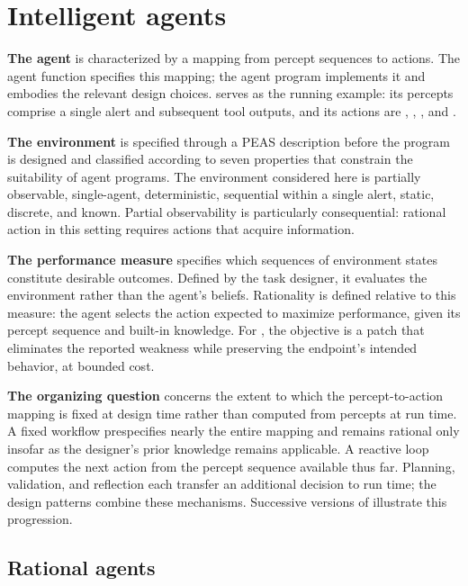 \section{Intelligent agents}
\label{sec:agents}

\begin{upshot}
\item \textbf{The agent} is characterized by a mapping from percept sequences to actions.
  The agent function specifies this mapping; the agent program implements it and embodies
  the relevant design choices. \msa{} serves as the running example: its percepts comprise
  a single alert and subsequent tool outputs, and its actions are ,
  , , and .
\item \textbf{The environment} is specified through a PEAS description before the program
  is designed and classified according to seven properties that constrain the suitability
  of agent programs. The environment considered here is partially observable, single-agent,
  deterministic, sequential within a single alert, static, discrete, and known. Partial
  observability is particularly consequential: rational action in this setting requires
  actions that acquire information.
\item \textbf{The performance measure} specifies which sequences of environment states
  constitute desirable outcomes. Defined by the task designer, it evaluates the environment
  rather than the agent's beliefs. Rationality is defined relative to this measure: the agent
  selects the action expected to maximize performance, given its percept sequence and built-in
  knowledge. For \msa{}, the objective is a patch that eliminates the reported weakness while
  preserving the endpoint's intended behavior, at bounded cost.
\item \textbf{The organizing question} concerns the extent to which the percept-to-action
  mapping is fixed at design time rather than computed from percepts at run time. A fixed
  workflow prespecifies nearly the entire mapping and remains rational only insofar as the
  designer's prior knowledge remains applicable. A reactive loop computes the next action
  from the percept sequence available thus far. Planning, validation, and reflection each
  transfer an additional decision to run time; the design patterns combine these mechanisms.
  Successive versions of \msa{} illustrate this progression.
\end{upshot}

\subsection{Rational agents}
\label{sec:agents-rational}

